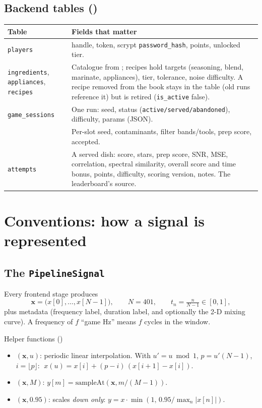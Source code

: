 \documentclass[11pt,a4paper]{article}
\begin{document}
\subsection{Backend tables ()}
\begin{longtable}{@{}P{3.4cm}P{12.1cm}@{}}
\toprule
Table & Fields that matter \\
\midrule
\endhead
\texttt{players} & handle, token, scrypt \texttt{password\_hash}, points, unlocked tier. \\
\texttt{ingredients}, \texttt{appliances}, \texttt{recipes} & Catalogue from ; recipes hold targets (seasoning, blend, marinate, appliances), tier, tolerance, noise difficulty. A recipe removed from the book stays in the table (old runs reference it) but is retired (\texttt{is\_active} false). \\
\texttt{game\_sessions} & One run: seed, status (\texttt{active/served/abandoned}), difficulty, params (JSON). \\
 & Per-slot seed, contaminants, filter bands/tools, prep score, accepted. \\
\texttt{attempts} & A served dish: score, stars, prep score, SNR, MSE, correlation, spectral similarity, overall score and time bonus, points, difficulty, scoring version, notes. The leaderboard's source. \\
\bottomrule
\end{longtable}

\section{Conventions: how a signal is represented}
\subsection{The \texttt{PipelineSignal}}
Every frontend stage produces
\[
\mathbf{x}=\bigl(x[0],\dots,x[N-1]\bigr),\qquad N=401,\qquad t_n=\tfrac{n}{N-1}\in[0,1],
\]
plus metadata (frequency label, duration label, and optionally the 2-D mixing curve).
A frequency of $f$ ``game Hz'' means $f$ cycles in the window.

\begin{mathbox}{Helper functions ()}
\begin{itemize}[leftmargin=*]
\item {}$(\mathbf{x},u)$: periodic linear interpolation. With $u'=u \bmod 1$,
  $p=u'(N-1)$, $i=\lfloor p\rfloor$:
  $\;x(u)=x[i]+(p-i)\,(x[i+1]-x[i])$.
\item {}$(\mathbf{x},M)$: $y[m]=\text{sampleAt}(\mathbf{x},m/(M-1))$.
\item {}$(\mathbf{x},0.95)$: scales \emph{down only}:
  $y=x\cdot\min(1,\,0.95/\max_n|x[n]|)$.
\end{itemize}
\end{mathbox}
\end{document}
